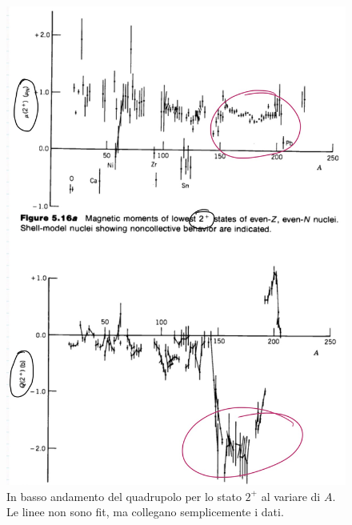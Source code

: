 \begin{figure}[h]
    \centering
    \includegraphics[scale=0.25]{Immagini/150200_2.png}
    \caption{In basso andamento del quadrupolo per lo stato $2^+$ al variare di $A$. Le linee non sono fit, ma collegano semplicemente i dati.}
    \label{graf2+1}
\end{figure}
